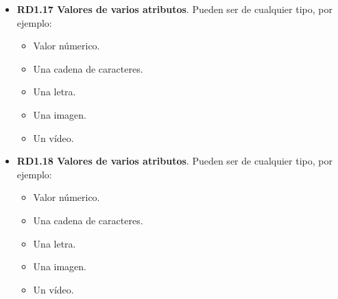 \begin{itemize}
	\item \textbf{RD1.17 Valores de varios atributos}. Pueden ser de cualquier tipo, por ejemplo:
	\begin{itemize}
		\item Valor númerico.
		\item Una cadena de caracteres.
		\item Una letra.
		\item Una imagen.
		\item Un vídeo.
	\end{itemize}
	
	\item \textbf{RD1.18 Valores de varios atributos}. Pueden ser de cualquier tipo, por ejemplo:
	\begin{itemize}
		\item Valor númerico.
		\item Una cadena de caracteres.
		\item Una letra.
		\item Una imagen.
		\item Un vídeo.
	\end{itemize}
\end{itemize}




